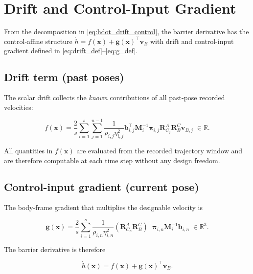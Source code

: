 \documentclass[11pt,a4paper]{article}
\newcommand{\R}{\mathbb{R}}
\begin{document}
\section{Drift and Control-Input Gradient}

From the decomposition in \eqref{eq:hdot_drift_control}, the barrier
derivative has the control-affine structure
$\dot{h}=f(\bm{x})+\bm{g}(\bm{x})^{\top}\bm{v}_{B}$ with drift and
control-input gradient defined in \eqref{eq:drift_def}--\eqref{eq:g_def}.

\subsection{Drift term (past poses)}

The scalar drift collects the \emph{known} contributions of all past-pose
recorded velocities:
\begin{resultbox}
\begin{equation}
  \boxed{
  f(\bm{x})
  = \frac{2}{s}\sum_{i=1}^{s}\sum_{j=1}^{n-1}
  \frac{1}{\rho_{i,j}\eta_{i,j}^{2}}
  \bm{b}_{i,j}^{\top}\bm{M}_{i}^{-1}\bm{\pi}_{i,j}
  \bm{R}_{C_j}^{A}\bm{R}_{B}^{C}\bm{v}_{B,j}
  \;\in\R.}
  \label{eq:drift_boxed}
\end{equation}
\end{resultbox}
All quantities in $f(\bm{x})$ are evaluated from the recorded trajectory
window and are therefore computable at each time step without any design
freedom.

\subsection{Control-input gradient (current pose)}

The body-frame gradient that multiplies the designable velocity is
\begin{keyresult}
\begin{equation}
  \boxed{
  \bm{g}(\bm{x})
  = \frac{2}{s}\sum_{i=1}^{s}
  \frac{1}{\rho_{i,n}\eta_{i,n}^{2}}
  \left(\bm{R}_{C_n}^{A}\bm{R}_{B}^{C}\right)^{\top}
  \bm{\pi}_{i,n}\bm{M}_{i}^{-1}\bm{b}_{i,n}
  \;\in\R^3.}
  \label{eq:g_boxed}
\end{equation}
\end{keyresult}
The barrier derivative is therefore
\begin{keyresult}
\begin{equation}
  \boxed{
  \dot{h}(\bm{x})=f(\bm{x})+\bm{g}(\bm{x})^{\top}\bm{v}_{B}.}
  \label{eq:hdot_linear_average}
\end{equation}
\end{keyresult}
\end{document}
